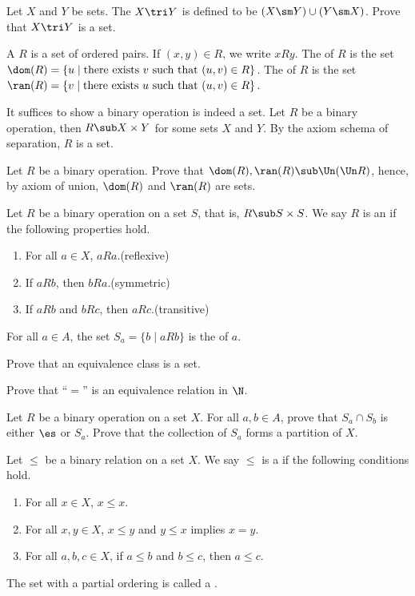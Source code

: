 \documentclass[10pt]{article}
\begin{document}
\begin{problem}
    Let $X$ and $Y$ be sets. The  $X\tri Y$ is defined to be $(X\sm Y)\cup(Y\sm X)$. Prove that $X\tri Y$ is a set.
\end{problem}
\begin{definition}
    A  $R$ is a set of ordered pairs. If $(x,y)\in R$, we write $xRy$. The  of $R$ is the set $\dom(R)=\{u\mid\text{there exists}\ v\ \text{such that}\ (u,v)\in R\}$. The  of $R$ is the set $\ran(R)=\{v\mid\text{there exists}\ u\ \text{such that}\ (u,v)\in R\}$. 
\end{definition}
\par
It suffices to show a binary operation is indeed a set. Let $R$ be a binary operation, then $R\sub X\times Y$ for some sets $X$ and $Y$. By the axiom schema of separation, $R$ is a set. 
\begin{problem}
    Let $R$ be a binary operation. Prove that $\dom(R),\ran(R)\sub\Un(\Un R)$, hence, by axiom of union, $\dom(R)$ and $\ran(R)$ are sets.
\end{problem}
\begin{definition}
    Let $R$ be a binary operation on a set $S$, that is, $R\sub S\times S$. We say $R$ is an  if the following properties hold.
    \begin{enumerate}
        \item For all $a\in X$, $aRa$.\hfill(reflexive)
        \item If $aRb$, then $bRa$.\hfill(symmetric)
        \item If $aRb$ and $bRc$, then $aRc$.\hfill(transitive)
    \end{enumerate}
    For all $a\in A$, the set ${S}_{a}=\{b\mid aRb\}$ is the  of $a$. 
\end{definition}
\begin{problem}
    Prove that an equivalence class is a set.
\end{problem}
\begin{problem}
    Prove that ``$=$'' is an equivalence relation in $\N$.
\end{problem}
\begin{problem}
    Let $R$ be a binary operation on a set $X$. For all $a,b\in A$, prove that ${S}_{a}\cap{S}_{b}$ is either $\es$ or ${S}_{a}$. Prove that the collection of ${S}_{a}$ forms a partition of $X$.
\end{problem}
\begin{definition}
    Let $\le$ be a binary relation on a set $X$. We say $\le$ is a  if the following conditions hold.
    \begin{enumerate}
        \item For all $x\in X$, $x\le x$.
        \item For all $x,y\in X$, $x\le y$ and $y\le x$ implies $x=y$.
        \item For all $a,b,c\in X$, if $a\le b$ and $b\le c$, then $a\le c$.
    \end{enumerate}
    The set with a partial ordering is called a .
\end{definition}
\end{document}

